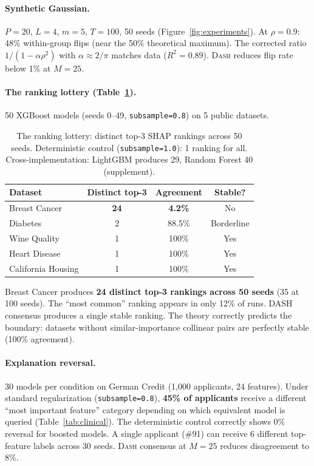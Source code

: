 \documentclass{article}
\newcommand{\DASH}{\textsc{Dash}}
\begin{document}
\paragraph{Synthetic Gaussian.}
$P{=}20$, $L{=}4$, $m{=}5$, $T{=}100$, 50 seeds (Figure~\ref{fig:experiments}). At $\rho = 0.9$: 48\% within-group flips (near the 50\% theoretical maximum). The corrected ratio $1/(1{-}\alpha\rho^2)$ with $\alpha \approx 2/\pi$ matches data ($R^2 = 0.89$). \DASH{} reduces flip rate below 1\% at $M = 25$.

\paragraph{The ranking lottery (Table~\ref{tab:ranking-lottery}).}
50 XGBoost models (seeds 0--49, \texttt{subsample=0.8}) on 5 public datasets.

\begin{table}[t]
\centering
\caption{The ranking lottery: distinct top-3 SHAP rankings across 50 seeds. Deterministic control (\texttt{subsample=1.0}): 1 ranking for all. Cross-implementation: LightGBM produces 29, Random Forest 40 (supplement).}
\label{tab:ranking-lottery}
\small
\begin{tabular}{@{}lccc@{}}
\toprule
Dataset & Distinct top-3 & Agreement & Stable? \\
\midrule
Breast Cancer & \textbf{24} & \textbf{4.2\%} & No \\
Diabetes & 2 & 88.5\% & Borderline \\
Wine Quality & 1 & 100\% & Yes \\
Heart Disease & 1 & 100\% & Yes \\
California Housing & 1 & 100\% & Yes \\
\bottomrule
\end{tabular}
\end{table}

Breast Cancer produces \textbf{24 distinct top-3 rankings across 50 seeds} (35 at 100 seeds). The ``most common'' ranking appears in only 12\% of runs. DASH consensus produces a single stable ranking. The theory correctly predicts the boundary: datasets without similar-importance collinear pairs are perfectly stable (100\% agreement).

\paragraph{Explanation reversal.}
30 models per condition on German Credit (1,000 applicants, 24 features). Under standard regularization (\texttt{subsample=0.8}), \textbf{45\% of applicants} receive a different ``most important feature'' category depending on which equivalent model is queried (Table~\ref{tab:clinical}). The deterministic control correctly shows 0\% reversal for boosted models. A single applicant (\#91) can receive 6 different top-feature labels across 30 seeds. \DASH{} consensus at $M=25$ reduces disagreement to 8\%.
\end{document}
